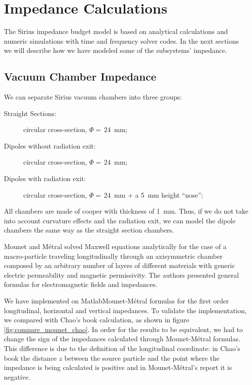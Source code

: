 \chapter{Impedance Calculations}

The Sirius impedance budget model is based on analytical calculations and numeric simulations with time and frequency solver codes. In the next sections we will describe how we have modeled some of the subsystems' impedance.

\section{Vacuum Chamber Impedance}

We can separate Sirius vacuum chambers into three groups:
\begin{description}
 \item[Straight Sections:] circular cross-section, $\Phi = \,$\SI{24}{\milli\meter};
 \item[Dipoles without radiation exit:] circular cross-section, $\Phi = \,$\SI{24}{\milli\meter};
 \item[Dipoles with radiation exit:] circular cross-section, $\Phi = \,$\SI{24}{\milli\meter} + a \SI{5}{\milli\meter} height ``nose'';
\end{description}

All chambers are made of cooper with thickness of \SI{1}{\milli\meter}. Thus, if we do not take into account curvature effects and the radiation exit, we can model the dipole chambers the same way as the straight section chambers.

Mounet and Métral \cite{mounet_metral2009} solved Maxwell equations analytically for the case of a macro-particle traveling longitudinally through an axisymmetric chamber composed by an arbitrary number of layers of different materials with generic electric permeability and magnetic permissivity. The authors presented general formulas for electromagnetic fields and impedances.

We have implemented on Matlab\textregistered Mounet-Métral formulas for the first order longitudinal, horizontal and vertical impedances. To validate the implementation, we compared with Chao's book calculation, as shown in figure \ref{fig:compare_mounet_chao}. In order for the results to be equivalent, we had to change the sign of the impedances calculated through Mounet-Métral formulas. This difference is due to the definition of the longitudinal coordinate: in Chao's book the distance $z$ between the source particle and the point where the impedance is being calculated is positive and in Mounet-Métral's report it is negative.

